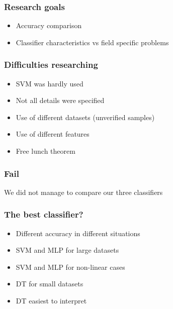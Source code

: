 \documentclass{beamer}
\begin{document}

\begin{frame}
\frametitle{Research goals}

	\begin{itemize}
		\item Accuracy comparison
		\item Classifier characteristics vs field specific problems
	 \end{itemize}
	 
\end{frame}


\begin{frame}
\frametitle{Difficulties researching}

	\begin{itemize}
		\item SVM was hardly used
		\item Not all details were specified
		\item Use of different datasets (unverified samples)
		\item Use of different features
		\item Free lunch theorem	 
	\end{itemize}

\end{frame}


\begin{frame}
\frametitle{Fail}

	\centerline{We did not manage to compare our three classifiers}

\end{frame}


\begin{frame}
\frametitle{The best classifier?}

	\begin{itemize}
		\item Different accuracy in different situations
		\item SVM and MLP for large datasets
		\item SVM and MLP for non-linear cases
		\item DT for small datasets
		\item DT easiest to interpret
	\end{itemize}
	
\end{frame}
\end{document}
